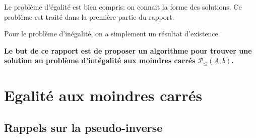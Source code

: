 \documentclass[10pt,a4paper]{article}
\begin{document}
Le problème d'égalité est bien compris: on connait la forme des solutions.
Ce problème est traité dans la première partie du rapport.

Pour le problème d'inégalité, on a simplement un résultat d'existence.

\textbf{Le but de ce rapport est de proposer un algorithme pour trouver une solution au problème d'intégalité aux moindres carrés $\mathcal{P}_{\leq} (A, b)$.}

\section{Egalité aux moindres carrés}

\subsection{Rappels sur la pseudo-inverse}
\end{document}
